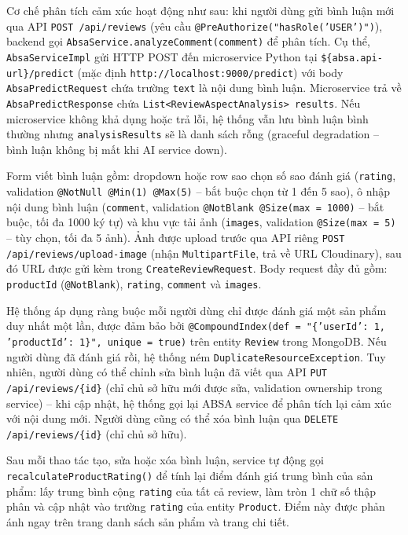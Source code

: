Cơ chế phân tích cảm xúc hoạt động như sau: khi người dùng gửi bình luận mới qua API \texttt{POST /api/reviews} (yêu cầu \texttt{@PreAuthorize("hasRole('USER')")}), backend gọi \texttt{AbsaService.analyzeComment(comment)} để phân tích. Cụ thể, \texttt{AbsaServiceImpl} gửi HTTP POST đến microservice Python tại \texttt{\$\{absa.api-url\}/predict} (mặc định \texttt{http://localhost:9000/predict}) với body \texttt{AbsaPredictRequest} chứa trường \texttt{text} là nội dung bình luận. Microservice trả về \texttt{AbsaPredictResponse} chứa \texttt{List<ReviewAspectAnalysis> results}. Nếu microservice không khả dụng hoặc trả lỗi, hệ thống vẫn lưu bình luận bình thường nhưng \texttt{analysisResults} sẽ là danh sách rỗng (graceful degradation -- bình luận không bị mất khi AI service down).

Form viết bình luận gồm: dropdown hoặc row sao chọn số sao đánh giá (\texttt{rating}, validation \texttt{@NotNull @Min(1) @Max(5)} -- bắt buộc chọn từ 1 đến 5 sao), ô nhập nội dung bình luận (\texttt{comment}, validation \texttt{@NotBlank @Size(max = 1000)} -- bắt buộc, tối đa 1000 ký tự) và khu vực tải ảnh (\texttt{images}, validation \texttt{@Size(max = 5)} -- tùy chọn, tối đa 5 ảnh). Ảnh được upload trước qua API riêng \texttt{POST /api/reviews/upload-image} (nhận \texttt{MultipartFile}, trả về URL Cloudinary), sau đó URL được gửi kèm trong \texttt{CreateReviewRequest}. Body request đầy đủ gồm: \texttt{productId} (\texttt{@NotBlank}), \texttt{rating}, \texttt{comment} và \texttt{images}.

Hệ thống áp dụng ràng buộc mỗi người dùng chỉ được đánh giá một sản phẩm duy nhất một lần, được đảm bảo bởi \texttt{@CompoundIndex(def = "\{'userId': 1, 'productId': 1\}", unique = true)} trên entity \texttt{Review} trong MongoDB. Nếu người dùng đã đánh giá rồi, hệ thống ném \texttt{DuplicateResourceException}. Tuy nhiên, người dùng có thể chỉnh sửa bình luận đã viết qua API \texttt{PUT /api/reviews/\{id\}} (chỉ chủ sở hữu mới được sửa, validation ownership trong service) -- khi cập nhật, hệ thống gọi lại ABSA service để phân tích lại cảm xúc với nội dung mới. Người dùng cũng có thể xóa bình luận qua \texttt{DELETE /api/reviews/\{id\}} (chỉ chủ sở hữu).

Sau mỗi thao tác tạo, sửa hoặc xóa bình luận, service tự động gọi \texttt{recalculateProductRating()} để tính lại điểm đánh giá trung bình của sản phẩm: lấy trung bình cộng \texttt{rating} của tất cả review, làm tròn 1 chữ số thập phân và cập nhật vào trường \texttt{rating} của entity \texttt{Product}. Điểm này được phản ánh ngay trên trang danh sách sản phẩm và trang chi tiết.

